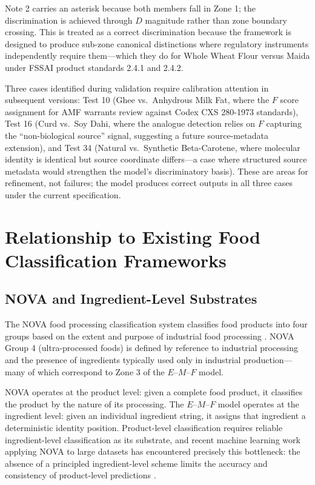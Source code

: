 \documentclass[12pt,a3paper]{article}
\begin{document}
Note 2 carries an asterisk because both members fall in Zone 1; the discrimination is achieved through $D$ magnitude rather than zone boundary crossing. This is treated as a correct discrimination because the framework is designed to produce sub-zone canonical distinctions where regulatory instruments independently require them---which they do for Whole Wheat Flour versus Maida under FSSAI product standards 2.4.1 and 2.4.2.

Three cases identified during validation require calibration attention in subsequent versions: Test 10 (Ghee vs.\ Anhydrous Milk Fat, where the $F$ score assignment for AMF warrants review against Codex CXS 280-1973 standards), Test 16 (Curd vs.\ Soy Dahi, where the analogue detection relies on $F$ capturing the ``non-biological source'' signal, suggesting a future source-metadata extension), and Test 34 (Natural vs.\ Synthetic Beta-Carotene, where molecular identity is identical but source coordinate differs---a case where structured source metadata would strengthen the model's discriminatory basis). These are areas for refinement, not failures; the model produces correct outputs in all three cases under the current specification.

\newpage


\section{Relationship to Existing Food Classification Frameworks}
\label{ch:nova}

\subsection{NOVA and Ingredient-Level Substrates}

The NOVA food processing classification system classifies food products into four groups based on the extent and purpose of industrial food processing \cite{Arora_MLProcessing_2025,Ispirova_Informatics_2025}. NOVA Group 4 (ultra-processed foods) is defined by reference to industrial processing and the presence of ingredients typically used only in industrial production---many of which correspond to Zone 3 of the $E$--$M$--$F$ model.

NOVA operates at the product level: given a complete food product, it classifies the product by the nature of its processing. The $E$--$M$--$F$ model operates at the ingredient level: given an individual ingredient string, it assigns that ingredient a deterministic identity position. Product-level classification requires reliable ingredient-level classification as its substrate, and recent machine learning work applying NOVA to large datasets has encountered precisely this bottleneck: the absence of a principled ingredient-level scheme limits the accuracy and consistency of product-level predictions \cite{Arora_MLProcessing_2025,Ispirova_Informatics_2025}.
\end{document}
